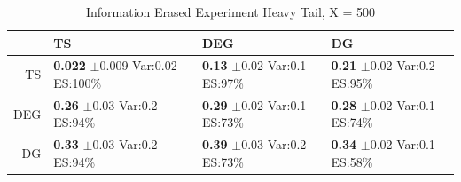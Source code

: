 \documentclass[11pt,letterpaper]{article}
\begin{document}
\begin{table}[ht]
\centering
\caption{Information Erased Experiment Heavy Tail, X = 500} 
\begin{tabular}{rlll}
  \hline
 & TS & DEG &  DG \\ 
  \hline
TS & \makecell{\textbf{0.022} $\pm$0.009\\Var:0.02\\ES:100\%} & \makecell{\textbf{0.13} $\pm$0.02\\Var:0.1\\ES:97\%} & \makecell{\textbf{0.21} $\pm$0.02\\Var:0.2\\ES:95\%} \\ 
  DEG & \makecell{\textbf{0.26} $\pm$0.03\\Var:0.2\\ES:94\%} & \makecell{\textbf{0.29} $\pm$0.02\\Var:0.1\\ES:73\%} & \makecell{\textbf{0.28} $\pm$0.02\\Var:0.1\\ES:74\%} \\ 
   DG & \makecell{\textbf{0.33} $\pm$0.03\\Var:0.2\\ES:94\%} & \makecell{\textbf{0.39} $\pm$0.03\\Var:0.2\\ES:73\%} & \makecell{\textbf{0.34} $\pm$0.02\\Var:0.1\\ES:58\%} \\ 
   \hline
\end{tabular}
\end{table}
\end{document}
